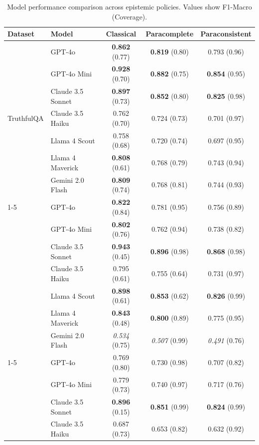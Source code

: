\begin{table}[htbp]
\centering
\caption{Model performance comparison across epistemic policies. Values show F1-Macro (Coverage).}
\small
\begin{tabular}{ll|ccc}
\toprule
\textbf{Dataset} & \textbf{Model} & \textbf{Classical} & \textbf{Paracomplete} & \textbf{Paraconsistent} \\
\midrule
\multirow{7}{*}{TruthfulQA} & GPT-4o & \textbf{0.862} (0.77) & \textbf{0.819} (0.80) & 0.793 (0.96) \\
 & GPT-4o Mini & \textbf{0.928} (0.70) & \textbf{0.882} (0.75) & \textbf{0.854} (0.95) \\
 & Claude 3.5 Sonnet & \textbf{0.897} (0.73) & \textbf{0.852} (0.80) & \textbf{0.825} (0.98) \\
 & Claude 3.5 Haiku & 0.762 (0.70) & 0.724 (0.73) & 0.701 (0.97) \\
 & Llama 4 Scout & 0.758 (0.68) & 0.720 (0.74) & 0.697 (0.95) \\
 & Llama 4 Maverick & \textbf{0.808} (0.61) & 0.768 (0.79) & 0.743 (0.94) \\
 & Gemini 2.0 Flash & \textbf{0.809} (0.74) & 0.768 (0.81) & 0.744 (0.93) \\
\cline{1-5}
\multirow{7}{*}{SimpleQA} & GPT-4o & \textbf{0.822} (0.84) & 0.781 (0.95) & 0.756 (0.89) \\
 & GPT-4o Mini & \textbf{0.802} (0.76) & 0.762 (0.94) & 0.738 (0.82) \\
 & Claude 3.5 Sonnet & \textbf{0.943} (0.45) & \textbf{0.896} (0.98) & \textbf{0.868} (0.98) \\
 & Claude 3.5 Haiku & 0.795 (0.61) & 0.755 (0.64) & 0.731 (0.97) \\
 & Llama 4 Scout & \textbf{0.898} (0.61) & \textbf{0.853} (0.62) & \textbf{0.826} (0.99) \\
 & Llama 4 Maverick & \textbf{0.843} (0.48) & \textbf{0.800} (0.89) & 0.775 (0.95) \\
 & Gemini 2.0 Flash & \textit{0.534} (0.75) & \textit{0.507} (0.99) & \textit{0.491} (0.76) \\
\cline{1-5}
\multirow{7}{*}{MMLU-Pro} & GPT-4o & 0.769 (0.80) & 0.730 (0.98) & 0.707 (0.82) \\
 & GPT-4o Mini & 0.779 (0.73) & 0.740 (0.97) & 0.717 (0.76) \\
 & Claude 3.5 Sonnet & \textbf{0.896} (0.15) & \textbf{0.851} (0.99) & \textbf{0.824} (0.99) \\
 & Claude 3.5 Haiku & 0.687 (0.73) & 0.653 (0.82) & 0.632 (0.92) \\

\end{tabular}
\end{table}

